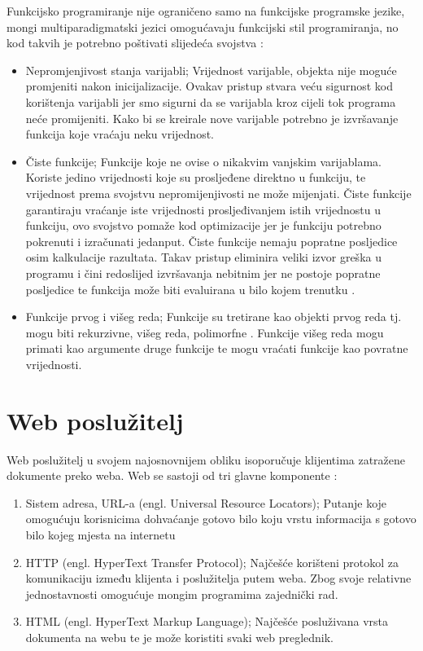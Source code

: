 \documentclass[]{foi} %
\begin{document}
Funkcijsko programiranje nije ograničeno samo na funkcijske programske jezike,
mongi multiparadigmatski jezici omogućavaju funkcijski stil programiranja, no kod takvih je
potrebno poštivati slijedeća svojstva \cite{rovzic2016lambda}:
\begin{itemize}
	\item Nepromjenjivost stanja varijabli; Vrijednost varijable, objekta nije moguće promjeniti
	      nakon inicijalizacije. Ovakav pristup stvara veću sigurnost kod korištenja varijabli jer
	      smo sigurni da se varijabla kroz cijeli tok programa neće promijeniti. Kako bi se kreirale
	      nove varijable potrebno je izvršavanje funkcija koje vraćaju neku vrijednost.
	\item Čiste funkcije; Funkcije koje ne ovise o nikakvim vanjskim varijablama. Koriste jedino vrijednosti
	      koje su prosljeđene direktno u funkciju, te vrijednost prema svojstvu nepromijenjivosti ne može mijenjati.
	      Čiste funkcije garantiraju vraćanje iste vrijednosti prosljeđivanjem istih vrijednostu u funkciju,
	      ovo svojstvo pomaže kod optimizacije jer je funkciju potrebno pokrenuti i izračunati jedanput.
	      Čiste funkcije nemaju popratne posljedice osim kalkulacije razultata. Takav pristup eliminira
	      veliki izvor greška u programu i čini redoslijed izvršavanja nebitnim jer ne postoje popratne
	      posljedice te funkcija može biti evaluirana u bilo kojem trenutku \cite{hughes1989functional}.
	\item Funkcije prvog i višeg reda; Funkcije su tretirane kao objekti prvog reda tj. mogu biti rekurzivne,
        višeg reda, polimorfne \cite{10.1145/72551.72554}. Funkcije višeg reda mogu primati kao argumente
        druge funkcije te mogu vraćati funkcije kao povratne vrijednosti.
\end{itemize}

\chapter{Web poslužitelj}

Web poslužitelj u svojem najosnovnijem obliku isoporučuje klijentima zatražene dokumente preko weba.
Web se sastoji od tri glavne komponente \cite{yeager1996web}:
\begin{enumerate}
    \item Sistem adresa, URL-a (engl. Universal Resource Locators); Putanje koje omogućuju korisnicima
        dohvaćanje gotovo bilo koju vrstu informacija s gotovo bilo kojeg mjesta na internetu
    \item HTTP (engl. HyperText Transfer Protocol); Najčešće korišteni protokol za komunikaciju između
        klijenta i poslužitelja putem weba. Zbog svoje relativne jednostavnosti omogućuje mongim programima
        zajednički rad.
    \item HTML (engl. HyperText Markup Language); Najčešće posluživana vrsta dokumenta na webu te je može
        koristiti svaki web preglednik.
\end{enumerate}
\end{document}
